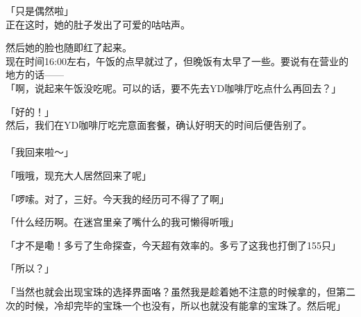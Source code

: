 「只是偶然啦」\\

正在这时，她的肚子发出了可爱的咕咕声。

然后她的脸也随即红了起来。\\

现在时间16:00左右，午饭的点早就过了，但晚饭有太早了一些。要说有在营业的地方的话——\\

「啊，说起来午饭没吃呢。可以的话，要不先去YD咖啡厅吃点什么再回去？」

「好的！」\\

然后，我们在YD咖啡厅吃完意面套餐，确认好明天的时间后便告别了。\\

\sqsplit\\

「我回来啦～」

「哦哦，现充大人居然回来了呢」

「啰嗦。对了，三好。今天我的经历可不得了了啊」

「什么经历啊。在迷宫里亲了嘴什么的我可懒得听哦」

「才不是嘞！多亏了生命探查，今天超有效率的。多亏了这我也打倒了155只」

「所以？」

「当然也就会出现宝珠的选择界面咯？虽然我是趁着她不注意的时候拿的，但第二次的时候，冷却完毕的宝珠一个也没有，所以也就没有能拿的宝珠了。然后呢」


